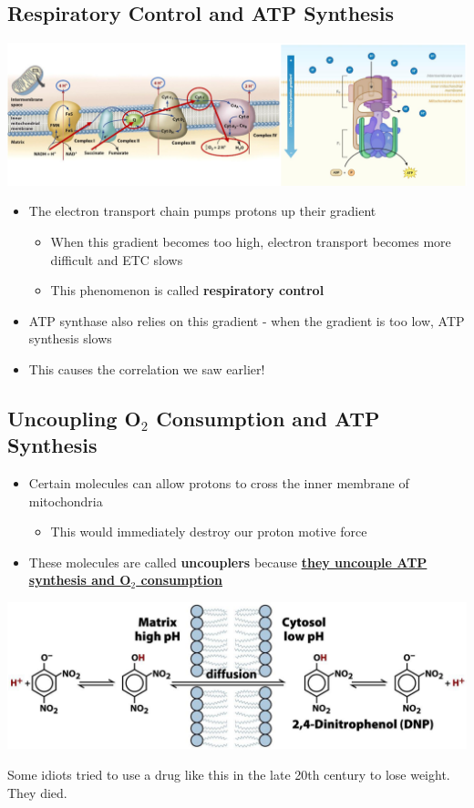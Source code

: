 \documentclass[10pt]{article}
\begin{document}
\subsection*{Respiratory Control and ATP Synthesis}
\begin{center} 
	\includegraphics*[width=\textwidth]{L3_7.png}
\end{center}
\begin{itemize}
	\item The electron transport chain pumps protons up their gradient
	\begin{itemize}
        \item When this gradient becomes too high, electron transport becomes more difficult and ETC slows
        \item This phenomenon is called \textbf{respiratory control}
    \end{itemize}
    \item ATP synthase also relies on this gradient - when the gradient is too low, ATP synthesis slows
    \item This causes the correlation we saw earlier!
\end{itemize}

\subsection*{Uncoupling O$_2$ Consumption and ATP Synthesis}
\begin{itemize}
	\item Certain molecules can allow protons to cross the inner membrane of mitochondria
	\begin{itemize}
        \item This would immediately destroy our proton motive force
    \end{itemize}
    \item These molecules are called \textbf{uncouplers} because \textbf{\underline{they uncouple ATP synthesis and O$_2$ consumption}}
\end{itemize}
\begin{center} 
	\includegraphics*[width=\textwidth]{L3_8.png}
\end{center}
Some idiots tried to use a drug like this in the late 20th century to lose weight.  They died.
\end{document}
